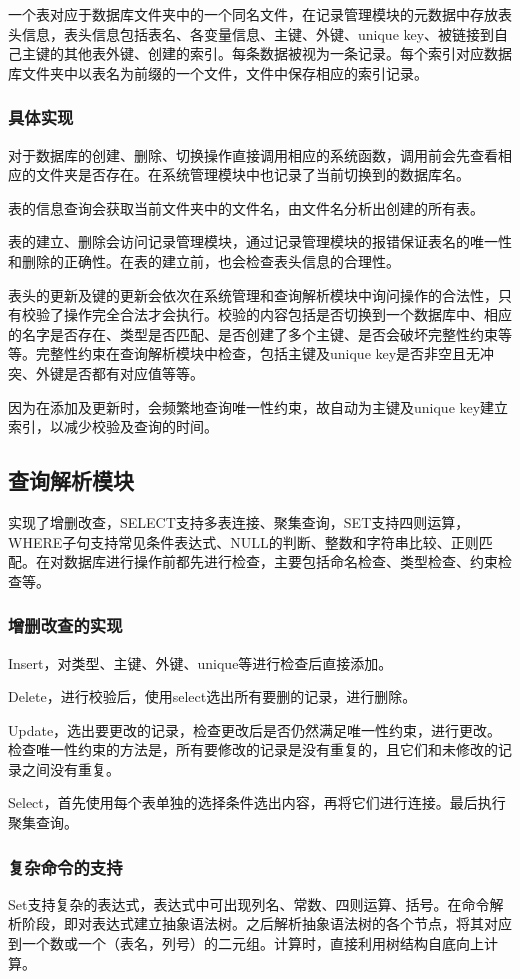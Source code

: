 \documentclass{article}
\begin{document}
一个表对应于数据库文件夹中的一个同名文件，在记录管理模块的元数据中存放表头信息，表头信息包括表名、各变量信息、主键、外键、unique key、被链接到自己主键的其他表外键、创建的索引。每条数据被视为一条记录。每个索引对应数据库文件夹中以表名为前缀的一个文件，文件中保存相应的索引记录。

\subsubsection{具体实现}

对于数据库的创建、删除、切换操作直接调用相应的系统函数，调用前会先查看相应的文件夹是否存在。在系统管理模块中也记录了当前切换到的数据库名。

表的信息查询会获取当前文件夹中的文件名，由文件名分析出创建的所有表。

表的建立、删除会访问记录管理模块，通过记录管理模块的报错保证表名的唯一性和删除的正确性。在表的建立前，也会检查表头信息的合理性。

表头的更新及键的更新会依次在系统管理和查询解析模块中询问操作的合法性，只有校验了操作完全合法才会执行。校验的内容包括是否切换到一个数据库中、相应的名字是否存在、类型是否匹配、是否创建了多个主键、是否会破坏完整性约束等等。完整性约束在查询解析模块中检查，包括主键及unique key是否非空且无冲突、外键是否都有对应值等等。

因为在添加及更新时，会频繁地查询唯一性约束，故自动为主键及unique key建立索引，以减少校验及查询的时间。

\subsection{查询解析模块}
实现了增删改查，SELECT支持多表连接、聚集查询，SET支持四则运算，WHERE子句支持常见条件表达式、NULL的判断、整数和字符串比较、正则匹配。在对数据库进行操作前都先进行检查，主要包括命名检查、类型检查、约束检查等。
\subsubsection{增删改查的实现}
Insert，对类型、主键、外键、unique等进行检查后直接添加。

Delete，进行校验后，使用select选出所有要删的记录，进行删除。

Update，选出要更改的记录，检查更改后是否仍然满足唯一性约束，进行更改。检查唯一性约束的方法是，所有要修改的记录是没有重复的，且它们和未修改的记录之间没有重复。

Select，首先使用每个表单独的选择条件选出内容，再将它们进行连接。最后执行聚集查询。
\subsubsection{复杂命令的支持}
Set支持复杂的表达式，表达式中可出现列名、常数、四则运算、括号。在命令解析阶段，即对表达式建立抽象语法树。之后解析抽象语法树的各个节点，将其对应到一个数或一个（表名，列号）的二元组。计算时，直接利用树结构自底向上计算。
\end{document}
